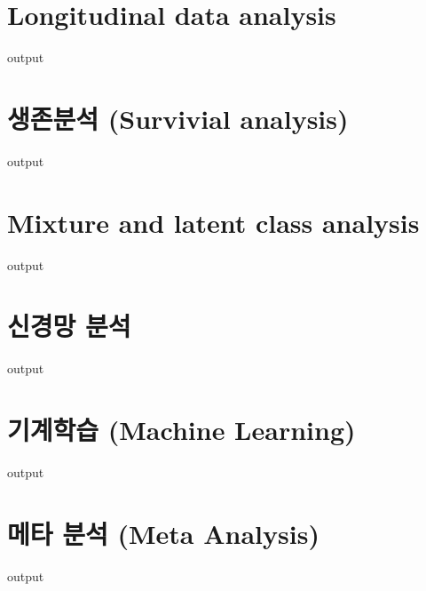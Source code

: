 \documentclass{book}
\begin{document}
\section{Longitudinal data analysis}
\begin{Schunk}
\begin{Soutput}
output
\end{Soutput}
\end{Schunk}

\section{생존분석 (Survivial analysis)}
\begin{Schunk}
\begin{Soutput}
output
\end{Soutput}
\end{Schunk}

\section{Mixture and latent class analysis}
\begin{Schunk}
\begin{Soutput}
output
\end{Soutput}
\end{Schunk}

\section{신경망 분석}
\begin{Schunk}
\begin{Soutput}
output
\end{Soutput}
\end{Schunk}

\section{기계학습 (Machine Learning)}
\begin{Schunk}
\begin{Soutput}
output
\end{Soutput}
\end{Schunk}

\section{메타 분석 (Meta Analysis)}
\begin{Schunk}
\begin{Soutput}
output
\end{Soutput}
\end{Schunk}
\end{document}
